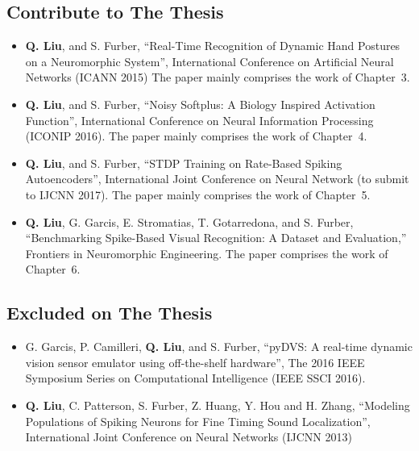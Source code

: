 \subsection{Contribute to The Thesis}
\begin{itemize}
	\item 
	\textbf{Q. Liu}, and S. Furber, “Real-Time Recognition of Dynamic Hand Postures on a Neuromorphic System”, International Conference on Artificial Neural Networks (ICANN 2015)
	The paper mainly comprises the work of Chapter~3.
	
	\item 
	\textbf{Q. Liu}, and S. Furber, “Noisy Softplus: A Biology Inspired Activation Function”, International Conference on Neural Information Processing (ICONIP 2016). 
	The paper mainly comprises the work of Chapter~4.
	
	
	\item 
	\textbf{Q. Liu}, and S. Furber, “STDP Training on Rate-Based Spiking Autoencoders”, International Joint Conference on Neural Network (to submit to IJCNN 2017).
	The paper mainly comprises the work of Chapter~5.
	
	\item 
	\textbf{Q. Liu}, G. Garcis, E. Stromatias, T. Gotarredona, and S. Furber, “Benchmarking Spike-Based Visual Recognition: A Dataset and Evaluation,” Frontiers in Neuromorphic Engineering.
	The paper comprises the work of Chapter~6.
	
\end{itemize}

\subsection{Excluded on The Thesis}
\begin{itemize}
	\item 
	G. Garcis, P. Camilleri, \textbf{Q. Liu}, and S. Furber, “pyDVS: A real-time dynamic vision sensor emulator using off-the-shelf hardware”, The 2016 IEEE Symposium Series on Computational Intelligence (IEEE SSCI 2016).
	
	\item
	\textbf{Q. Liu}, C. Patterson, S. Furber, Z. Huang, Y. Hou and H. Zhang, “Modeling Populations of Spiking Neurons for Fine Timing Sound Localization”, International Joint Conference on Neural Networks (IJCNN 2013)
\end{itemize}	

